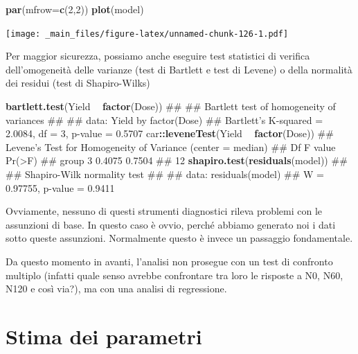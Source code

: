 \documentclass[a4paper,12pt,oneside]{book}
\newenvironment{Shaded}{\begin{snugshade}}{\end{snugshade}}
\newcommand{\KeywordTok}[1]{\textcolor[rgb]{0.13,0.29,0.53}{\textbf{#1}}}
\newcommand{\DataTypeTok}[1]{\textcolor[rgb]{0.13,0.29,0.53}{#1}}
\newcommand{\DecValTok}[1]{\textcolor[rgb]{0.00,0.00,0.81}{#1}}
\newcommand{\StringTok}[1]{\textcolor[rgb]{0.31,0.60,0.02}{#1}}
\newcommand{\OperatorTok}[1]{\textcolor[rgb]{0.81,0.36,0.00}{\textbf{#1}}}
\newcommand{\NormalTok}[1]{#1}
\theoremstyle{definition}
\theoremstyle{definition}
\theoremstyle{definition}
\theoremstyle{remark}
\begin{document}
\begin{Shaded}
\begin{Highlighting}[]
\KeywordTok{par}\NormalTok{(}\DataTypeTok{mfrow=}\KeywordTok{c}\NormalTok{(}\DecValTok{2}\NormalTok{,}\DecValTok{2}\NormalTok{))}
\KeywordTok{plot}\NormalTok{(model)}
\end{Highlighting}
\end{Shaded}

\texttt{[image: \_main\_files/figure-latex/unnamed-chunk-126-1.pdf]}

Per maggior sicurezza, possiamo anche eseguire test statistici di
verifica dell'omogeneità delle varianze (test di Bartlett e test di
Levene) o della normalità dei residui (test di Shapiro-Wilks)

\begin{Shaded}
\begin{Highlighting}[]
\KeywordTok{bartlett.test}\NormalTok{(Yield }\OperatorTok{~}\StringTok{ }\KeywordTok{factor}\NormalTok{(Dose))}
\NormalTok{## }
\NormalTok{##  Bartlett test of homogeneity of variances}
\NormalTok{## }
\NormalTok{## data:  Yield by factor(Dose)}
\NormalTok{## Bartlett's K-squared = 2.0084, df = 3, p-value = 0.5707}
\NormalTok{car}\OperatorTok{::}\KeywordTok{leveneTest}\NormalTok{(Yield }\OperatorTok{~}\StringTok{ }\KeywordTok{factor}\NormalTok{(Dose))}
\NormalTok{## Levene's Test for Homogeneity of Variance (center = median)}
\NormalTok{##       Df F value Pr(>F)}
\NormalTok{## group  3  0.4075 0.7504}
\NormalTok{##       12}
\KeywordTok{shapiro.test}\NormalTok{(}\KeywordTok{residuals}\NormalTok{(model))}
\NormalTok{## }
\NormalTok{##  Shapiro-Wilk normality test}
\NormalTok{## }
\NormalTok{## data:  residuals(model)}
\NormalTok{## W = 0.97755, p-value = 0.9411}
\end{Highlighting}
\end{Shaded}

Ovviamente, nessuno di questi strumenti diagnostici rileva problemi con
le assunzioni di base. In questo caso è ovvio, perché abbiamo generato
noi i dati sotto queste assunzioni. Normalmente questo è invece un
passaggio fondamentale.

Da questo momento in avanti, l'analisi non prosegue con un test di
confronto multiplo (infatti quale senso avrebbe confrontare tra loro le
risposte a N0, N60, N120 e così via?), ma con una analisi di
regressione.

\section{Stima dei parametri}\label{stima-dei-parametri-2}
\end{document}
